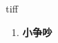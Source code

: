 
\begin{frame}
{\huge tiff}
\begin{center}
\begin{enumerate}\Large
  \item \textbf{小争吵}
\end{enumerate}
\end{center}
\end{frame}
